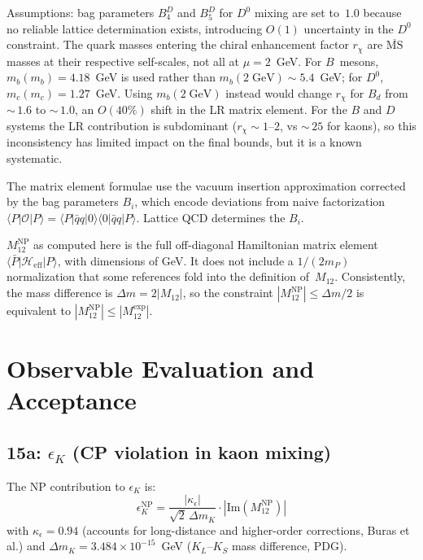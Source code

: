 \documentclass[11pt]{article}
\begin{document}
Assumptions: bag parameters $B_4^D$ and $B_5^D$ for $D^0$ mixing are set
to~$1.0$ because no reliable lattice determination exists, introducing $O(1)$
uncertainty in the $D^0$ constraint. The quark masses entering the chiral
enhancement factor $r_{\chi}$ are $\overline{\mathrm{MS}}$ masses at their
respective self-scales, not all at $\mu = 2$~GeV. For $B$~mesons,
$m_b(m_b) = 4.18$~GeV is used rather than $m_b(2\;\text{GeV}) \sim 5.4$~GeV;
for $D^0$, $m_c(m_c) = 1.27$~GeV. Using $m_b(2\;\text{GeV})$ instead would
change $r_{\chi}$ for $B_d$ from ${\sim}\,1.6$ to ${\sim}\,1.0$, an
$O(40\%)$ shift in the LR matrix element. For the $B$ and $D$ systems the LR
contribution is subdominant ($r_{\chi} \sim 1$--$2$, vs ${\sim}\,25$ for
kaons), so this inconsistency has limited impact on the final bounds, but it
is a known systematic.

The matrix element formulae use the vacuum insertion approximation corrected by
the bag parameters $B_i$, which encode deviations from naive factorization
$\langle P|\mathcal{O}|P\rangle =
\langle P|\bar{q}q|0\rangle\langle 0|\bar{q}q|P\rangle$.
Lattice QCD determines the $B_i$.

$M_{12}^{\mathrm{NP}}$ as computed here
is the full off-diagonal Hamiltonian matrix element
$\langle\bar{P}|\mathcal{H}_{\mathrm{eff}}|P\rangle$, with dimensions of GeV.
It does not include a $1/(2m_P)$ normalization that some references fold into
the definition of~$M_{12}$.  Consistently, the mass difference is
$\Delta m = 2|M_{12}|$, so the constraint
$|M_{12}^{\mathrm{NP}}| \le \Delta m/2$ is equivalent to
$|M_{12}^{\mathrm{NP}}| \le |M_{12}^{\mathrm{exp}}|$.

\section{Observable Evaluation and Acceptance}
\label{sec:step15}

\subsection{15a: $\epsilon_K$ (CP violation in kaon mixing)}
\label{sec:step15a}

The NP contribution to $\epsilon_K$ is:
\begin{equation}
  \epsilon_K^{\mathrm{NP}} = \frac{|\kappa_\epsilon|}
    {\sqrt{2}\,\Delta m_K} \cdot |\mathrm{Im}(M_{12}^{\mathrm{NP}})|
\end{equation}
with $\kappa_\epsilon = 0.94$ (accounts for long-distance and higher-order
corrections, Buras et al.) and
$\Delta m_K = 3.484\times10^{-15}$~GeV ($K_L$--$K_S$ mass difference, PDG).
\end{document}
